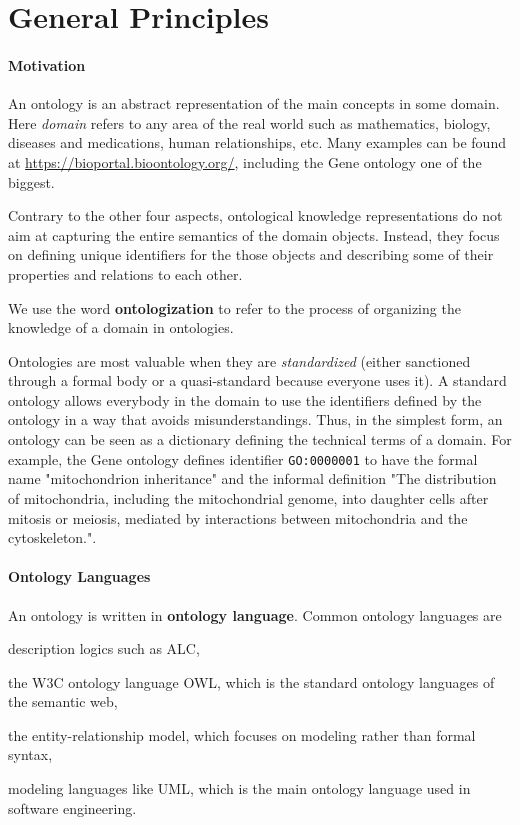 \section{General Principles}

\paragraph{Motivation}
An ontology is an abstract representation of the main concepts in some domain.
Here \emph{domain} refers to any area of the real world such as mathematics, biology, diseases and medications, human relationships, etc.
Many examples can be found at \url{https://bioportal.bioontology.org/}, including the Gene ontology one of the biggest.

Contrary to the other four aspects, ontological knowledge representations do not aim at capturing the entire semantics of the domain objects.
Instead, they focus on defining unique identifiers for the those objects and describing some of their properties and relations to each other.

We use the word \textbf{ontologization} to refer to the process of organizing the knowledge of a domain in ontologies.

Ontologies are most valuable when they are \emph{standardized} (either sanctioned through a formal body or a quasi-standard because everyone uses it).
A standard ontology allows everybody in the domain to use the identifiers defined by the ontology in a way that avoids misunderstandings.
Thus, in the simplest form, an ontology can be seen as a dictionary defining the technical terms of a domain.
For example, the Gene ontology defines identifier \texttt{GO:0000001} to have the formal name "mitochondrion inheritance" and the informal definition "The distribution of mitochondria, including the mitochondrial genome, into daughter cells after mitosis or meiosis, mediated by interactions between mitochondria and the cytoskeleton.".

\paragraph{Ontology Languages}
An ontology is written in \textbf{ontology language}.
Common ontology languages are
\begin{compactitem}
 \item description logics such as ALC,
 \item the W3C ontology language OWL, which is the standard ontology languages of the semantic web,
 \item the entity-relationship model, which focuses on modeling rather than formal syntax,
 \item modeling languages like UML, which is the main ontology language used in software engineering.
\end{compactitem}

